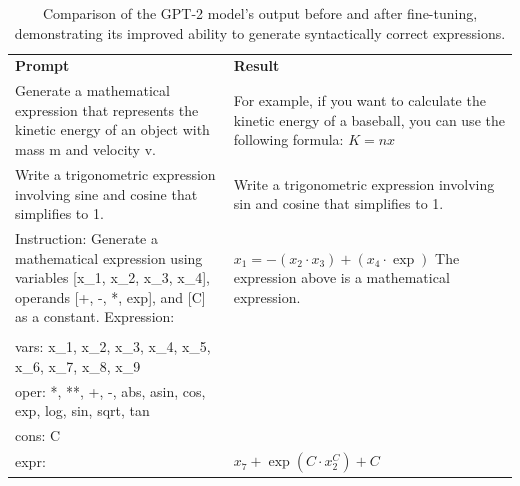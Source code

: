     \begin{table}[h!]
        \centering
        \caption{Comparison of the GPT-2 model's output before and after fine-tuning, demonstrating its improved ability to generate syntactically correct expressions.}
        \label{tab:gpt2-comparison}
        \ttfamily
        \begin{tabularx}{\textwidth}{ >{\RaggedRight}X >{\RaggedRight}X }
        \toprule
        
        \multicolumn{2}{c}{\textbf{Base Model}} \\
        \midrule
        \textbf{Prompt} & \textbf{Result} \\
        \midrule
        
        Generate a mathematical expression that represents the kinetic energy of an object with mass m and velocity v. 
        & 
        For example, if you want to calculate the kinetic energy of a baseball, you can use the following formula: $K=nx$ \\
        \addlinespace
        
        Write a trigonometric expression involving sine and cosine that simplifies to 1.
        &
        Write a trigonometric expression involving sin and cosine that simplifies to 1. \\
        \addlinespace
        
        Instruction: Generate a mathematical expression using variables [x\_1, x\_2, x\_3, x\_4], operands [+, -, *, exp], and [C] as a constant. Expression:
        &
        $x_1 = -(x_2 \cdot x_3) + (x_4 \cdot \exp)$ The expression above is a mathematical expression. \\
        \midrule[1pt]
        
        \multicolumn{2}{c}{\textbf{After Fine-Tuning}} \\
        \midrule
        
        vars: x\_1, x\_2, x\_3, x\_4, x\_5, x\_6, x\_7, x\_8, x\_9 \\ 
        oper: *, **, +, -, abs, asin, cos, exp, log, sin, sqrt, tan \\ 
        cons: C \\ 
        expr:
        &
        $x_7 + \exp(C \cdot x_2^C) + C$ \\
        \bottomrule
        \end{tabularx}
    \end{table}
